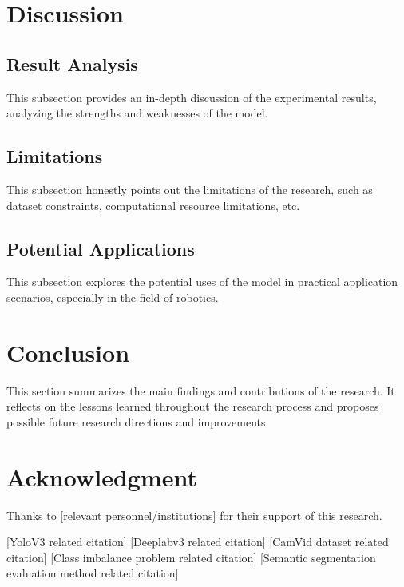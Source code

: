 \documentclass[conference]{IEEEtran}
\begin{document}
\section{Discussion}
\subsection{Result Analysis}
This subsection provides an in-depth discussion of the experimental results, analyzing the strengths and weaknesses of the model.

\subsection{Limitations}
This subsection honestly points out the limitations of the research, such as dataset constraints, computational resource limitations, etc.

\subsection{Potential Applications}
This subsection explores the potential uses of the model in practical application scenarios, especially in the field of robotics.

\section{Conclusion}
This section summarizes the main findings and contributions of the research. It reflects on the lessons learned throughout the research process and proposes possible future research directions and improvements.

\section*{Acknowledgment}
Thanks to [relevant personnel/institutions] for their support of this research.

\begin{thebibliography}{00}
 [YoloV3 related citation]
 [Deeplabv3 related citation]
 [CamVid dataset related citation]
 [Class imbalance problem related citation]
 [Semantic segmentation evaluation method related citation]
\end{thebibliography}
\end{document}
